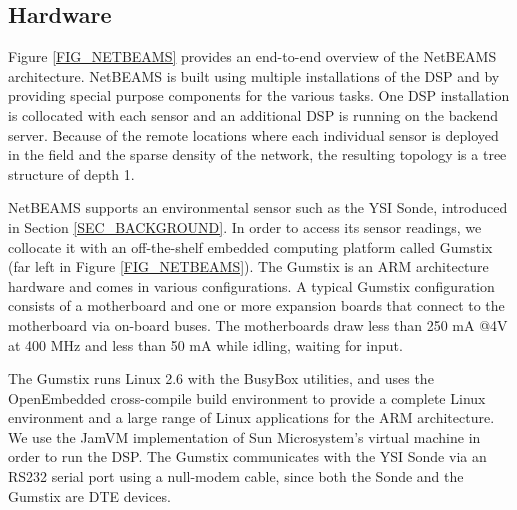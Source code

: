 \documentclass[conference]{IEEEtran}
\begin{document}
\subsection{Hardware}

Figure \ref{FIG_NETBEAMS} provides an end-to-end overview of the
NetBEAMS architecture. NetBEAMS is built using multiple installations
of the DSP and by providing special purpose components for the various
tasks. One DSP installation is collocated with each sensor and an
additional DSP is running on the backend server. Because of the remote
locations where each individual sensor is deployed in the field and
the sparse density of the network, the resulting topology is a tree
structure of depth 1.

NetBEAMS supports an environmental sensor such as the YSI Sonde,
introduced in Section \ref{SEC_BACKGROUND}. In order to access its
sensor readings, we collocate it with an off-the-shelf embedded
computing platform called Gumstix \cite{gumstix01} (far left in Figure
\ref{FIG_NETBEAMS}).  The Gumstix is an ARM architecture hardware and comes in
various configurations.  A typical Gumstix configuration
consists of a motherboard and one or more expansion boards that
connect to the motherboard via on-board buses.  The motherboards draw
less than 250 mA @4V at 400 MHz and less than 50 mA while idling,
waiting for input.

The Gumstix runs Linux 2.6 with the BusyBox utilities, and uses the
OpenEmbedded cross-compile build environment to provide a complete
Linux environment and a large range of Linux applications for the ARM
architecture.  We use the JamVM \cite{jamvm01} implementation of Sun
Microsystem's virtual machine in order to run the DSP. The Gumstix
communicates with the YSI Sonde via an RS232 serial port using a
null-modem cable, since both the Sonde and the Gumstix are DTE devices.

\end{document}
